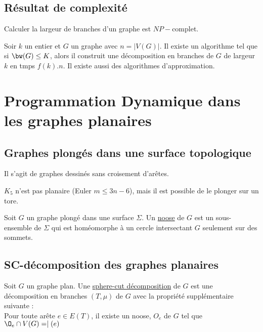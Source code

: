 \documentclass[a4paper, 11pt]{thesis}
\begin{document}
\subsection{Résultat de complexité}

\begin{thrm}
    Calculer la largeur de branches d'un graphe est $NP-$complet.
\end{thrm}

\begin{thrm}
    Soir $k$ un entier et $G$ un graphe avec $n = |V(G)|$. Il existe un algorithme tel que si
    $\bw(G) \leq K$, alors il construit une décomposition en branches de $G$ de largeur $k$ en tmps
    $f(k).n$. Il existe aussi des algorithmes d'approximation.
\end{thrm}

\section{Programmation Dynamique dans les graphes planaires}

\subsection{Graphes plongés dans une surface topologique}

Il s'agit de graphes dessinés sans croisement d'arêtes.

\begin{ex}
    $K_5$ n'est pas planaire (Euler $m \leq 3n - 6$), mais il est possible de le plonger sur un
    tore.
\end{ex}

\begin{df}
    Soit $G$ un graphe plongé dans une surface $\Sigma$. Un \underline{noose} de $G$ est un
    sous-ensemble de $\Sigma$ qui est homéomorphe à un cercle  intersectant $G$ seulement sur des
    sommets.
\end{df}

\subsection{SC-décomposition des graphes planaires}

\begin{df}
    Soit $G$ un graphe plan. Une \underline{sphere-cut décomposition} de $G$ est une décomposition
    en branches $(T, \mu)$ de $G$ avec la propriété supplémentaire suivante : \\

    Pour toute arête $e \in E(T)$, il existe un noose, $O_e$ de $G$ tel que $\O_e \cap V(G) =
    \mid(e)$
\end{df}
\end{document}
